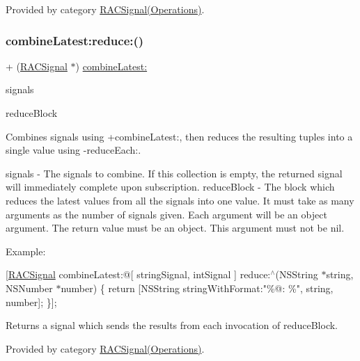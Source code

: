 Provided by category \mbox{\hyperlink{category_r_a_c_signal_07_operations_08_a8a7a563a48665fb1203e2b37db6e5e98}{R\+A\+C\+Signal(\+Operations)}}.

\mbox{\label{interface_r_a_c_signal_a5e4d2db914a14c415646d9fdda131221}} 
\subsubsection{\texorpdfstring{combine\+Latest\+:reduce\+:()}{combineLatest:reduce:()}\hspace{0.1cm}{\footnotesize\ttfamily [1/3]}}
{\footnotesize\ttfamily + (\mbox{\hyperlink{interface_r_a_c_signal}{R\+A\+C\+Signal}} $\ast$) \mbox{\hyperlink{category_r_a_c_signal_07_operations_08_a8a7a563a48665fb1203e2b37db6e5e98}{combine\+Latest\+:}} \begin{DoxyParamCaption}\item[{(id$<$N\+S\+Fast\+Enumeration$>$)}]{signals }\item[{reduce:(id($^\wedge$)())}]{reduce\+Block }\end{DoxyParamCaption}}

Combines signals using +combine\+Latest\+:, then reduces the resulting tuples into a single value using -\/reduce\+Each\+:.

signals -\/ The signals to combine. If this collection is empty, the returned signal will immediately complete upon subscription. reduce\+Block -\/ The block which reduces the latest values from all the signals into one value. It must take as many arguments as the number of signals given. Each argument will be an object argument. The return value must be an object. This argument must not be nil.

Example\+:

\mbox{[}\mbox{\hyperlink{interface_r_a_c_signal}{R\+A\+C\+Signal}} combine\+Latest\+:@\mbox{[} string\+Signal, int\+Signal \mbox{]} reduce\+:$^\wedge$(N\+S\+String $\ast$string, N\+S\+Number $\ast$number) \{ return \mbox{[}N\+S\+String string\+With\+Format\+:"\%@\+: \%", string, number\mbox{]}; \}\mbox{]};

Returns a signal which sends the results from each invocation of {\ttfamily reduce\+Block}. 

Provided by category \mbox{\hyperlink{category_r_a_c_signal_07_operations_08_a5e4d2db914a14c415646d9fdda131221}{R\+A\+C\+Signal(\+Operations)}}.

